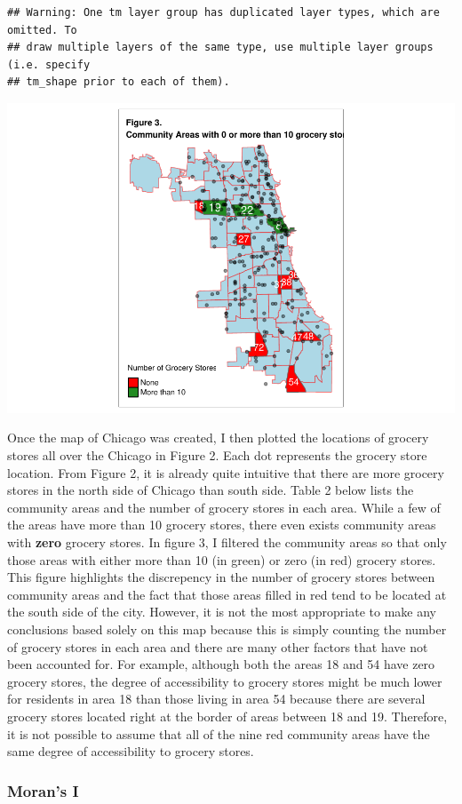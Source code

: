 \documentclass[
]{article}
\begin{document}
\begin{verbatim}
## Warning: One tm layer group has duplicated layer types, which are omitted. To
## draw multiple layers of the same type, use multiple layer groups (i.e. specify
## tm_shape prior to each of them).
\end{verbatim}

\includegraphics[width=0.5\linewidth]{Sam-Song_Coding-Sample_files/figure-latex/unnamed-chunk-4-2}

Once the map of Chicago was created, I then plotted the locations of
grocery stores all over the Chicago in Figure 2. Each dot represents the
grocery store location. From Figure 2, it is already quite intuitive
that there are more grocery stores in the north side of Chicago than
south side. Table 2 below lists the community areas and the number of
grocery stores in each area. While a few of the areas have more than 10
grocery stores, there even exists community areas with \textbf{zero}
grocery stores. In figure 3, I filtered the community areas so that only
those areas with either more than 10 (in green) or zero (in red) grocery
stores. This figure highlights the discrepency in the number of grocery
stores between community areas and the fact that those areas filled in
red tend to be located at the south side of the city. However, it is not
the most appropriate to make any conclusions based solely on this map
because this is simply counting the number of grocery stores in each
area and there are many other factors that have not been accounted for.
For example, although both the areas 18 and 54 have zero grocery stores,
the degree of accessibility to grocery stores might be much lower for
residents in area 18 than those living in area 54 because there are
several grocery stores located right at the border of areas between 18
and 19. Therefore, it is not possible to assume that all of the nine red
community areas have the same degree of accessibility to grocery stores.

\hypertarget{morans-i}{%
\subsubsection{Moran's I}\label{morans-i}}
\end{document}
